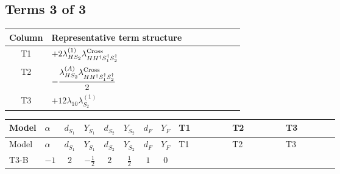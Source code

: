 \documentclass[8pt]{article}
\begin{document}
\begin{landscape}
\subsection*{Terms 3 of 3}
\begin{center}
\begin{tabular}{@{}c >{\raggedright\arraybackslash}p{0.82\linewidth}@{}}
\toprule
Column & Representative term structure \\
\midrule
T1 & \(\displaystyle +2 {\lambda_{HS_2}^{(1)}} {\lambda_{H H^\dagger S_1^\dagger S_2^\dagger}^{\rm Cross}}\) \\
\midrule
T2 & \(\displaystyle -\frac{{\lambda_{HS_2}^{(A)}} {\lambda_{H H^\dagger S_1^\dagger S_2^\dagger}^{\rm Cross}}}{2}\) \\
\midrule
T3 & \(\displaystyle +12 {\lambda_{10}} {\lambda_{S_2}^{(1)}}\) \\
\midrule
\bottomrule
\end{tabular}
\end{center}
\smallskip
\tiny
\begin{longtable}{@{}llcccccc >{\raggedright\arraybackslash}p{0.21\linewidth} >{\raggedright\arraybackslash}p{0.21\linewidth} >{\raggedright\arraybackslash}p{0.21\linewidth}@{}}
\toprule
Model & $\alpha$ & $d_{S_1}$ & $Y_{S_1}$ & $d_{S_2}$ & $Y_{S_2}$ & $d_F$ & $Y_F$ & T1 & T2 & T3 \\
\midrule
\endfirsthead
\toprule
Model & $\alpha$ & $d_{S_1}$ & $Y_{S_1}$ & $d_{S_2}$ & $Y_{S_2}$ & $d_F$ & $Y_F$ & T1 & T2 & T3 \\
\midrule
\endhead
T3-B & $-1$ & $2$ & $-\frac{1}{2}$ & $2$ & $\frac{1}{2}$ & $1$ & $0$ & \scriptsize\adjustbox{max width=\linewidth}{$\begin{gathered} +2 {\lambda_{HS_2}^{(1)}} {\lambda_{H H^\dagger S_1^\dagger S_2^\dagger}^{\rm Cross}}\end{gathered}$} & \scriptsize\adjustbox{max width=\linewidth}{$\begin{gathered} -\frac{{\lambda_{HS_2}^{(A)}} {\lambda_{H H^\dagger S_1^\dagger S_2^\dagger}^{\rm Cross}}}{2}\end{gathered}$} & \scriptsize\adjustbox{max width=\linewidth}{$\begin{gathered} +12 {\lambda_{10}} {\lambda_{S_2}^{(1)}}\end{gathered}$} \\
\midrule
\bottomrule
\end{longtable}
\end{landscape}
\end{document}
